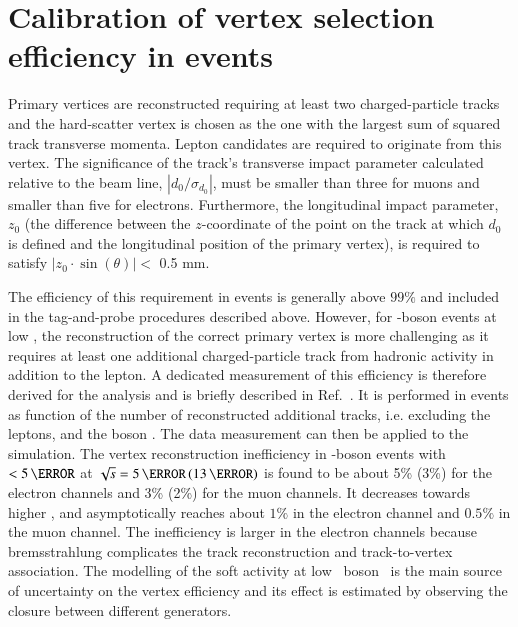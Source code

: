 
\section{Calibration of vertex selection efficiency in \Wlnu events}

Primary vertices are reconstructed requiring at least two
charged-particle tracks~\cite{ATL-PHYS-PUB-2015-026} and the hard-scatter
vertex is chosen as the one with the largest sum of squared track transverse
momenta. Lepton candidates are required to originate from this
vertex. The significance of the track's transverse impact parameter
calculated relative to the beam line, $|d_0/\sigma_{d_{0}}|$, must be
smaller than three for muons and smaller than five for
electrons. Furthermore, the longitudinal impact parameter, $z_0$ (the
difference between the $z$-coordinate of the point on the track at
which $d_0$ is defined and the longitudinal position of the primary
vertex), is required to satisfy $|z_0 \cdot \sin(\theta)| <$ 0.5 mm.

The efficiency of this requirement in \Zll events is generally above $99\%$
and included in the tag-and-probe procedures described
above. However, for \Wboson-boson events at low \pT, the
reconstruction of the correct primary vertex is more challenging as it
requires at least one additional charged-particle track from hadronic
activity in addition to the lepton. A dedicated measurement of this
efficiency is therefore derived for the \ptw analysis and is briefly described in Ref.~\cite{Atmani:2632159}. It is performed in
\Zll events as function of the number of reconstructed additional tracks, i.e. excluding the leptons, and the boson \pT. The data measurement can
then be applied to the \Wln simulation. The vertex reconstruction inefficiency in \Wboson-boson events with \ptw $< 5\,\GeV$ at
$\sqrt{s} = 5\,\TeV\,(13\,\TeV)$ is found to be about 5\% (3\%) for
the electron channels and 3\% (2\%) for the muon channels. It decreases towards higher \ptw,  and asymptotically reaches about $1\%$ in the
electron channel and $0.5\%$ in the muon channel. The inefficiency is larger in the electron channels because bremsstrahlung complicates the track reconstruction and track-to-vertex association.
The modelling of the soft activity at low \Wboson\ boson \pt\ is the main
source of uncertainty on the vertex efficiency and its effect is estimated by observing
the closure between different generators.


